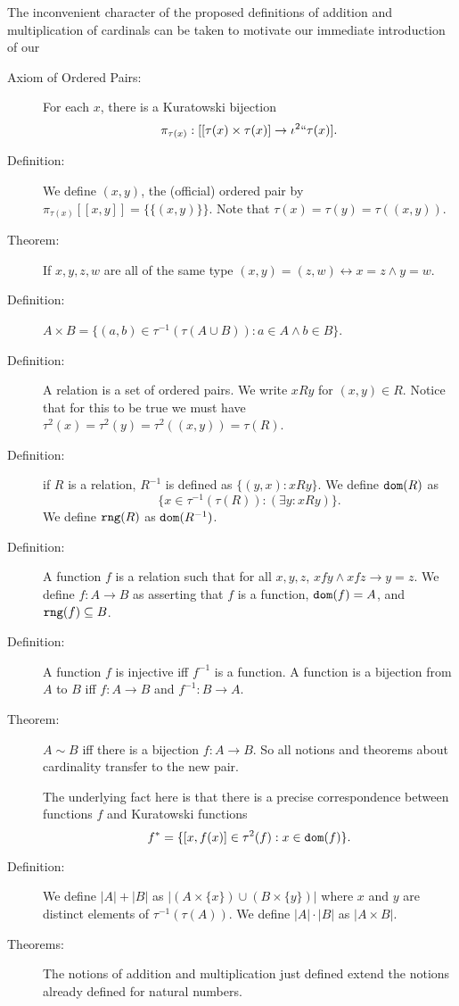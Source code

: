 \documentclass[12pt]{article}
\begin{document}
The inconvenient character of the proposed definitions of addition and multiplication of cardinals can be taken to motivate our immediate introduction of our

\begin{description}

\item[Axiom of Ordered Pairs:]  For each $x$, there is a Kuratowski bijection $$\pi_{\tau(x)}:[[\tau(x) \times \tau(x)] \rightarrow \iota^2``\tau(x)].$$

\item[Definition:]  We define $(x,y)$, the (official) ordered pair by $\pi_{\tau(x)}[[x,y]] = \{\{(x,y)\}\}$.  Note that $\tau(x) = \tau(y) = \tau((x,y))$.

\item[Theorem:]  If $x,y,z,w$ are all of the same type $(x,y)=(z,w) \leftrightarrow x=z \wedge y=w$.

\item[Definition:]  $A\times B = \{(a,b) \in \tau^{-1}(\tau(A\cup B)):a \in A \wedge b \in B\}$.

\item[Definition:]  A relation is a set of ordered pairs.  We write $x R y$ for $(x,y) \in R$.  Notice that for this to be true
we must have $\tau^2(x) = \tau^2(y) = \tau^2((x,y)) = \tau(R)$. 

\item[Definition:]  if $R$ is a relation, $R^{-1}$ is defined as $\{(y,x):xRy\}$. 
We define ${\tt dom}(R)$ as $$\{x \in \tau^{-1}(\tau(R)):(\exists y:xRy)\}.$$  We define ${\tt rng}(R)$ as ${\tt dom}(R^{-1})$.

\item[Definition:]  A function $f$ is a relation such that for all $x,y,z$, $xfy \wedge xfz \rightarrow y=z$.  We define $f:A \rightarrow B$ as asserting
that $f$ is a function, ${\tt dom}(f) = A$, and ${\tt rng}(f) \subseteq B$.

\item[Definition:]  A function $f$ is injective iff $f^{-1}$ is a function.  A  function is a  bijection from $A$ to $B$ iff $f:A \rightarrow B$
and $f^{-1}:B \rightarrow A$.

\item[Theorem:]  $A \sim B$ iff there is a bijection $f:A \rightarrow B$.  So all notions and theorems about cardinality transfer to the new pair.

The underlying fact here is that there is a precise correspondence between functions $f$ and Kuratowski functions $$f^* = \{[x,f(x)]\in \tau^2(f):x \in {\tt dom}(f)\}.$$

\item[Definition:]  We define $|A|+|B|$ as $|(A \times \{x\}) \cup (B \times \{y\})|$ where $x$ and $y$ are distinct elements of $\tau^{-1}(\tau(A))$.  We define
$|A| \cdot |B|$ as $|A \times B|$. 

\item[Theorems:]  The notions of addition and multiplication just defined extend the notions already defined for natural numbers.

\end{description}
\end{document}
